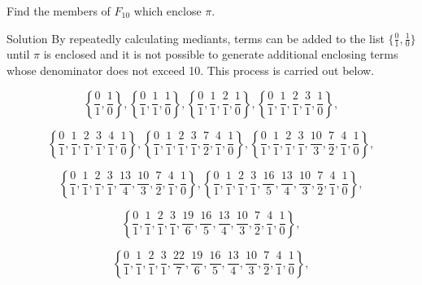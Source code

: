 \begin{vworkexamplestatement}
\label{ex:ccfr0:ssbt0:sdpt0:01}
Find the members of $F_{10}$ which enclose $\pi$.
\end{vworkexamplestatement}
\begin{vworkexampleparsection}{Solution}
By repeatedly calculating mediants, terms can be added to the list 
$\{\frac{0}{1}, \frac{1}{0} \}$ until $\pi$ is enclosed and it is not
possible to generate additional enclosing terms whose denominator does not
exceed 10.  This process is carried out below.

\begin{equation}
\left\{ {\frac{0}{1}, \frac{1}{0} } \right\}, 
\left\{ {\frac{0}{1}, \frac{1}{1}, \frac{1}{0} } \right\}, 
\left\{ {\frac{0}{1}, \frac{1}{1}, \frac{2}{1}, \frac{1}{0} } \right\}, 
\left\{ {\frac{0}{1}, \frac{1}{1}, \frac{2}{1}, \frac{3}{1}, \frac{1}{0} } \right\},
\end{equation}

\begin{equation}
\left\{ {\frac{0}{1}, \frac{1}{1}, \frac{2}{1}, \frac{3}{1}, 
         \frac{4}{1}, \frac{1}{0} } \right\}, 
\left\{ {\frac{0}{1}, \frac{1}{1}, \frac{2}{1}, \frac{3}{1}, \frac{7}{2},
         \frac{4}{1}, \frac{1}{0} } \right\}, 
\left\{ {\frac{0}{1}, \frac{1}{1}, \frac{2}{1}, \frac{3}{1}, \frac{10}{3}, \frac{7}{2},
         \frac{4}{1}, \frac{1}{0} } \right\}, 
\end{equation}

\begin{equation}
\left\{ {\frac{0}{1}, \frac{1}{1}, \frac{2}{1}, 
         \frac{3}{1}, \frac{13}{4}, \frac{10}{3}, \frac{7}{2},
         \frac{4}{1}, \frac{1}{0} } \right\}, 
\left\{ {\frac{0}{1}, \frac{1}{1}, \frac{2}{1}, 
         \frac{3}{1}, \frac{16}{5}, \frac{13}{4}, \frac{10}{3}, \frac{7}{2},
         \frac{4}{1}, \frac{1}{0} } \right\}, 
\end{equation}

\begin{equation}
\left\{ {\frac{0}{1}, \frac{1}{1}, \frac{2}{1}, 
         \frac{3}{1}, \frac{19}{6}, \frac{16}{5}, \frac{13}{4}, \frac{10}{3}, \frac{7}{2},
         \frac{4}{1}, \frac{1}{0} } \right\}, 
\end{equation}

\begin{equation}
\left\{ {\frac{0}{1}, \frac{1}{1}, \frac{2}{1}, 
         \frac{3}{1}, \frac{22}{7}, \frac{19}{6}, 
		 \frac{16}{5}, \frac{13}{4}, \frac{10}{3}, \frac{7}{2},
         \frac{4}{1}, \frac{1}{0} } \right\}, 
\end{equation}


\end{vworkexampleparsection}
